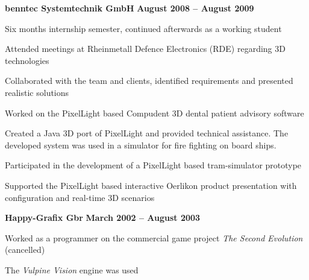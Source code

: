 \documentclass[margin,line]{Ofenberg_Resume}
\begin{document}
\begin{resume}
	\textbf{benntec Systemtechnik GmbH} \hfill \textbf{August 2008 -- August 2009}\vspace{-3mm}\\\vspace{-1mm}%
	\begin{list2}
		\item Six months internship semester, continued afterwards as a working student
		\item Attended meetings at Rheinmetall Defence Electronics (RDE) regarding 3D technologies
		\item Collaborated with the team and clients, identified requirements and presented realistic solutions
		\item Worked on the PixelLight based Compudent 3D dental patient advisory software
		\item Created a Java 3D port of PixelLight and provided technical assistance. The developed system was used in a simulator for fire fighting on board ships.
		\item Participated in the development of a PixelLight based tram-simulator prototype
		\item Supported the PixelLight based interactive Oerlikon product presentation with configuration and real-time 3D scenarios
	\end{list2}\vspace{-1.5mm}
	\textbf{Happy-Grafix Gbr} \hfill \textbf{March 2002 -- August 2003}\vspace{-3mm}\\\vspace{-1mm}%
	\begin{list2}
		\item Worked as a programmer on the commercial game project \emph{The Second Evolution} (cancelled)
		\item The \emph{Vulpine Vision} engine was used
	\end{list2}\vspace{-1.5mm}
\pagebreak



\end{resume}
\end{document}
